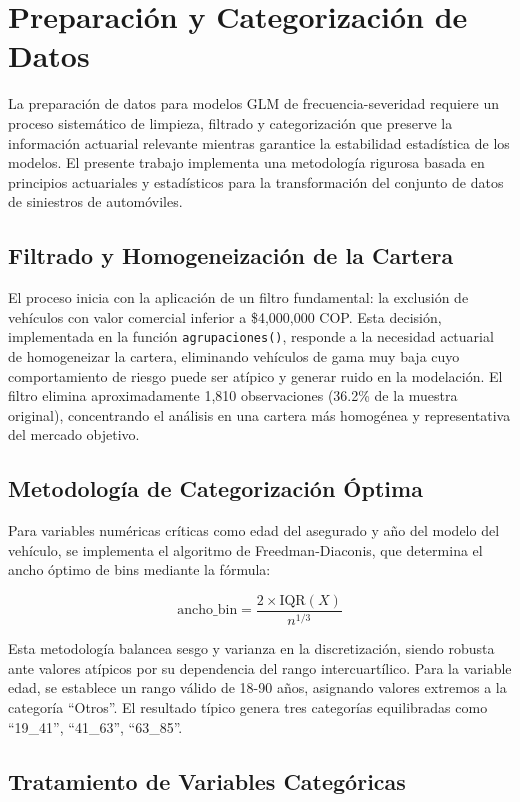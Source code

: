 \section{Preparación y Categorización de Datos}

La preparación de datos para modelos GLM de frecuencia-severidad requiere un proceso sistemático de limpieza, filtrado y categorización que preserve la información actuarial relevante mientras garantice la estabilidad estadística de los modelos. El presente trabajo implementa una metodología rigurosa basada en principios actuariales y estadísticos para la transformación del conjunto de datos de siniestros de automóviles.

\subsection{Filtrado y Homogeneización de la Cartera}

El proceso inicia con la aplicación de un filtro fundamental: la exclusión de vehículos con valor comercial inferior a \$4,000,000 COP. Esta decisión, implementada en la función \texttt{agrupaciones()}, responde a la necesidad actuarial de homogeneizar la cartera, eliminando vehículos de gama muy baja cuyo comportamiento de riesgo puede ser atípico y generar ruido en la modelación. El filtro elimina aproximadamente 1,810 observaciones (36.2\% de la muestra original), concentrando el análisis en una cartera más homogénea y representativa del mercado objetivo.

\subsection{Metodología de Categorización Óptima}

Para variables numéricas críticas como edad del asegurado y año del modelo del vehículo, se implementa el algoritmo de Freedman-Diaconis, que determina el ancho óptimo de bins mediante la fórmula:

$$\text{ancho\_bin} = \frac{2 \times \text{IQR}(X)}{n^{1/3}}$$

Esta metodología balancea sesgo y varianza en la discretización, siendo robusta ante valores atípicos por su dependencia del rango intercuartílico. Para la variable edad, se establece un rango válido de 18-90 años, asignando valores extremos a la categoría ``Otros''. El resultado típico genera tres categorías equilibradas como ``19\_41'', ``41\_63'', ``63\_85''.

\subsection{Tratamiento de Variables Categóricas}

